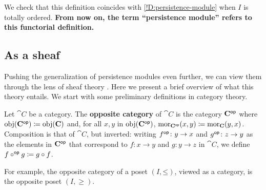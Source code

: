 We check that this definition coincides with \cref{!D:persistence-module} when $I$ is totally ordered. \textbf{From now on, the term ``persistence module'' refers to this functorial definition.}

\subsection{As a sheaf}

Pushing the generalization of persistence modules even further, we can view them through the lens of sheaf theory \cite{Berkouk2020,KashiwaraShapira2018}. Here we present a brief overview of what this theory entails. We start with some preliminary definitions in category theory.

\begin{definition}
  Let $\cat{C}$ be a category. The \textbf{opposite category} of $\cat{C}$ is the category $\mathbf{C}^{\mathsf{op}}$ where $\operatorname{obj}(\mathbf{C}^{\mathsf{op}}) \coloneq \operatorname{obj}(\mathbf{C})$ and, for all $x, y$ in $\operatorname{obj}(\mathbf{C}^{\mathsf{op}})$, $\operatorname{mor}_{\mathbf{C}^{\mathsf{op}}}(x, y) \coloneq \operatorname{mor}_{\mathbf{C}}(y, x)$. Composition is that of $\cat{C}$, but inverted: writing $f^{\mathsf{op}} \colon y \to x$ and $g^{\mathsf{op}} \colon z \to y$ as the elements in $\mathbf{C}^{\mathsf{op}}$ that correspond to $f \colon x \to y$ and $g \colon y \to z$ in $\cat{C}$, we define $f \circ^{\mathsf{op}} g \coloneq g \circ f$.
\end{definition}

For example, the opposite category of a poset $(I, \mathord{\leq})$, viewed as a category, is the opposite poset $(I, \geq)$.

